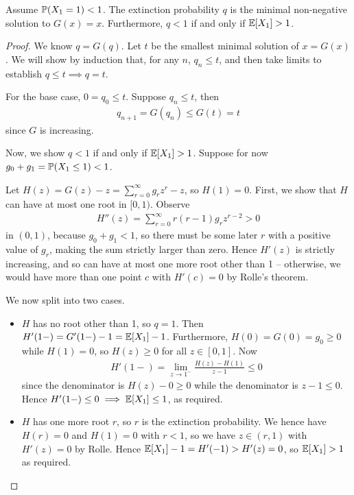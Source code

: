 \documentclass{../template/note}
\begin{document}
    \begin{proposition}
        Assume \(\mathbb P(X_1 = 1) < 1\). The extinction probability \(q\) is the minimal non-negative solution to \(G(x) = x\). Furthermore, \(q < 1\) if and only if \(\mathbb E[X_1] > 1\).
    \end{proposition}
    
    \begin{proof}
        We know \(q = G(q)\). Let \(t\) be the smallest minimal solution of \(x=G(x)\). We will show by induction that, for any \(n\), \(q_n \leq t\), and then take limits to establish \(q \leq t \implies q = t\).

        For the base case, \(0 = q_0 \leq t\). Suppose \(q_n \leq t\), then
        \begin{align*}
            q_{n+1} = G(q_n) \leq G(t) = t
        \end{align*}
        since \(G\) is increasing.      
        
        Now, we show \(q < 1\) if and only if \(\mathbb E[X_1] > 1\). Suppose for now \(g_0 + g_1 = \mathbb P(X_1 \leq 1) < 1\).

        Let \(H(z) = G(z) - z = \sum_{r=0}^\infty g_rz^r - z\), so \(H(1) = 0\). First, we show that \(H\) can have at most one root in \([0, 1)\). Observe
        \begin{align*}
            H''(z) = \sum_{r=0}^\infty r(r-1)g_rz^{r-2} > 0
        \end{align*}
        in \((0, 1)\), because \(g_0 + g_1 < 1\), so there must be some later \(r\) with a positive value of \(g_r\), making the sum strictly larger than zero. Hence \(H'(z)\) is strictly increasing, and so can have at most one more root other than 1 -- otherwise, we would have more than one point \(c\) with \(H'(c) = 0\) by Rolle's theorem.

        We now split into two cases.
        \begin{itemize}
            \item \(H\) has no root other than 1, so \(q=1\). Then \(H'(1-) = G'(1-) - 1 = \mathbb E[X_1] - 1\). Furthermore, \(H(0) = G(0) = g_0 \geq 0\) while \(H(1) = 0\), so \(H(z) \geq 0\) for all \(z \in [0, 1]\). Now
            \begin{align*}
                H'(1-) = \lim_{z \to 1^-} \frac{H(z)-H(1)}{z-1} \leq 0
            \end{align*}
            since the denominator is \(H(z) - 0 \geq 0\) while the denominator is \(z-1 \leq 0\). Hence \(H'(1-) \leq 0 \implies \mathbb E[X_1] \leq 1\), as required.
            \item \(H\) has one more root \(r\), so \(r\) is the extinction probability. We hence have \(H(r) = 0\) and \(H(1) = 0\) with \(r<1\), so we have \(z \in (r, 1)\) with \(H'(z) = 0\) by Rolle. Hence \(\mathbb E[X_1] - 1 = H'(-1) > H'(z) = 0\), so \(\mathbb E[X_1] > 1\) as required. 
        \end{itemize}


\end{proof}
\end{document}
